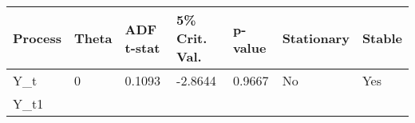 \documentclass{article}
\begin{document}
    \begin{longtable}[c]{@{}lllllll@{}}
\toprule
\begin{minipage}[b]{0.11\columnwidth}\raggedright\strut
Process
\strut\end{minipage} &
\begin{minipage}[b]{0.09\columnwidth}\raggedright\strut
Theta
\strut\end{minipage} &
\begin{minipage}[b]{0.15\columnwidth}\raggedright\strut
ADF t-stat
\strut\end{minipage} &
\begin{minipage}[b]{0.18\columnwidth}\raggedright\strut
5\% Crit. Val.
\strut\end{minipage} &
\begin{minipage}[b]{0.12\columnwidth}\raggedright\strut
p-value
\strut\end{minipage} &
\begin{minipage}[b]{0.15\columnwidth}\raggedright\strut
Stationary
\strut\end{minipage} &
\begin{minipage}[b]{0.10\columnwidth}\raggedright\strut
Stable
\strut\end{minipage}\tabularnewline
\midrule
\endhead
\begin{minipage}[t]{0.11\columnwidth}\raggedright\strut
Y\_t
\strut\end{minipage} &
\begin{minipage}[t]{0.09\columnwidth}\raggedright\strut
0
\strut\end{minipage} &
\begin{minipage}[t]{0.15\columnwidth}\raggedright\strut
0.1093
\strut\end{minipage} &
\begin{minipage}[t]{0.18\columnwidth}\raggedright\strut
-2.8644
\strut\end{minipage} &
\begin{minipage}[t]{0.12\columnwidth}\raggedright\strut
0.9667
\strut\end{minipage} &
\begin{minipage}[t]{0.15\columnwidth}\raggedright\strut
No
\strut\end{minipage} &
\begin{minipage}[t]{0.10\columnwidth}\raggedright\strut
Yes
\strut\end{minipage}\tabularnewline
\begin{minipage}[t]{0.11\columnwidth}\raggedright\strut
Y\_t1
\strut\end{minipage} &

\end{longtable}
\end{document}
